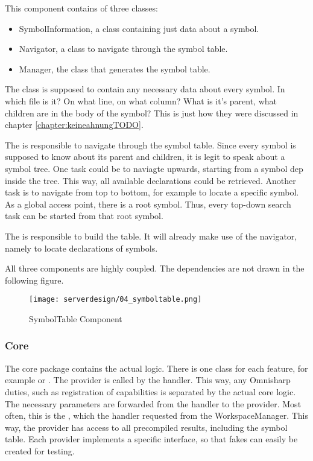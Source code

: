 This component contains of three classes:
\begin{itemize}
    \item SymbolInformation, a class containing just data about a symbol. 
    \item Navigator, a class to navigate through the symbol table.
    \item Manager, the class that generates the symbol table.
\end{itemize}

The  class is supposed to contain any necessary data about every symbol. In which file is it? On what line, on what column? What is it's parent, what children are in the body of the symbol? This is just how they were discussed in chapter \ref{chapter:keineahnungTODO}. 

The  is responsible to navigate through the symbol table. Since every symbol is supposed to know about its parent and children, it is legit to speak about a symbol tree. One task could be to naviagte upwards, starting from a symbol dep inside the tree. This way, all available declarations could be retrieved. Another task is to navigate from top to bottom, for example to locate a specific symbol. As a global access point, there is a root symbol. Thus, every top-down search task can be started from that root symbol.

The  is responsible to build the table. It will already make use of the navigator, namely to locate declarations of symbols.

All three components are highly coupled. The dependencies are not drawn in the following figure.


\begin{figure}[H]
    \centering
    \texttt{[image: serverdesign/04\_symboltable.png]}
    \caption{SymbolTable Component}
    \label{fig:server_st}
\end{figure}

\subsubsection {Core}
The core package contains the actual logic. There is one class for each feature, for example  or . The provider is called by the handler. This way, any Omnisharp duties, such as registration of capabilities is separated by the actual core logic. The necessary parameters are forwarded from the handler to the provider. Most often, this is the , which the handler requested from the WorkspaceManager. This way, the provider has access to all precompiled results, including the symbol table. Each provider implements a specific interface, so that fakes can easily be created for testing.


